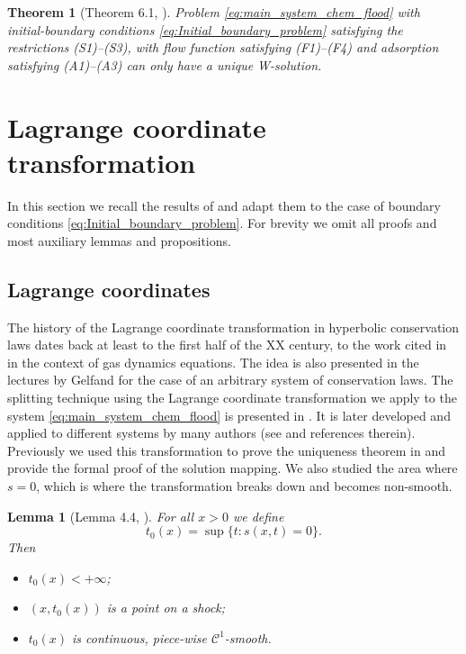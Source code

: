 \documentclass[12pt]{article}
\newtheorem{theorem}{Theorem}
\newtheorem{lemma}{Lemma}
\theoremstyle{definition}
\begin{document}
\begin{theorem}[Theorem 6.1, \cite{MR2024}]
\label{uniqueness-theorem}
Problem \eqref{eq:main_system_chem_flood} with initial-boundary conditions \eqref{eq:Initial_boundary_problem} satisfying the restrictions (S1)--(S3), with flow function satisfying (F1)--(F4) and adsorption satisfying (A1)--(A3) can only have a unique W-solution.
\end{theorem}

\section{Lagrange coordinate transformation}
\label{sec:Lagrange}

In this section we recall the results of \cite[Sect.~4]{MR2024} and adapt them to the case of boundary conditions \eqref{eq:Initial_boundary_problem}. For brevity we omit all proofs and most auxiliary lemmas and propositions.

\subsection{Lagrange coordinates}
\label{sec2-Lagrange}
The history of the Lagrange coordinate transformation in hyperbolic conservation laws dates back at least to the first half of the XX century, to the work \cite{Courant} cited in \cite{Wa87} in the context of gas dynamics equations. The idea is also presented in the lectures by Gelfand \cite{Gelfand} for the case of an arbitrary system of conservation laws. The splitting technique using the Lagrange coordinate transformation we apply to the system \eqref{eq:main_system_chem_flood} is presented in \cite{PiBeSh06}. It is later developed and applied to different systems by many authors (see \cite{Pires2021} and references therein). Previously we used this transformation to prove the uniqueness theorem in \cite{MR2024} and provide the formal proof of the solution mapping. We also studied the area where $s=0$, which is where the transformation breaks down and becomes non-smooth.

\begin{lemma}[Lemma 4.4, \cite{MR2024}]
\label{lemma:t0_is_shocks}
For all $x > 0$ we define
\[
t_0(x) = \sup\{ t: s(x, t) = 0 \}.
\]
Then 
\begin{itemize}
    \item $t_0(x) < +\infty$;
    \item $(x, t_0(x))$ is a point on a shock;
    \item $t_0(x)$ is continuous, piece-wise $\mathcal{C}^1$-smooth.
\end{itemize}
\end{lemma}
\end{document}

